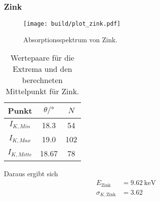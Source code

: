 \subsubsection*{Zink}
\begin{figure}[H]
    \centering
    \texttt{[image: build/plot\_zink.pdf]}
    \caption{Absorptionsspektrum von Zink.}
    \label{fig:zink}
\end{figure}
\begin{table}[H]                                                                                   
    \centering                                                                                     
        \caption{Wertepaare für die Extrema und den berechneten Mittelpunkt für Zink.}                      
        \label{tab:Zn}                                                                        
        \begin{tabular}{S S[table-format=2.2] S}                                                   
          \toprule                                                                                 
          {Punkt} & {$\theta /\si{\degree}$} & {$N$}\\                                            
          \midrule                                                                                 
          {$I_{K,Min  }$} & 18.3  &54   \\
          {$I_{K,Max  }$} & 19.0  &102  \\
          {$I_{K,Mitte}$} & 18.67 &78   \\
          \bottomrule                                                                              
        \end{tabular}                                                                              
      \end{table}                                                                                  
Daraus ergibt sich                                                                                 
\begin{align*}                                                                                     
    E_\text{Zink} &= \SI{9.62}{\kilo\electronvolt}\\                  
    \sigma_{K, \text{Zink}} &= \num{3.62}                      
\end{align*}                                                                                       

